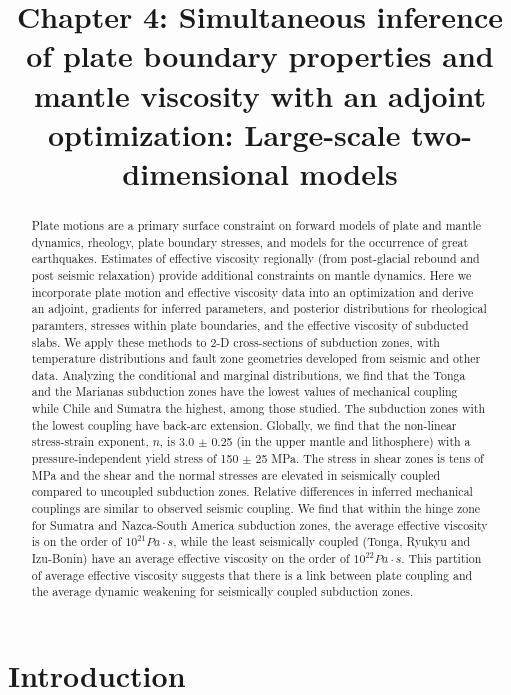 \documentclass[12pt]{article}
\date{}
\title{Chapter 4: Simultaneous inference of plate boundary properties and mantle viscosity with an adjoint optimization: Large-scale two-dimensional models}
\begin{document}
\maketitle
\begin{abstract}
 Plate motions are a primary surface constraint on forward models of plate and mantle dynamics, rheology, plate boundary stresses, and models for the occurrence of great earthquakes. Estimates of effective viscosity regionally (from post-glacial rebound and post seismic relaxation) provide additional constraints on mantle dynamics. 
Here we incorporate plate motion and effective viscosity data into an optimization and derive an adjoint, gradients for inferred parameters, and posterior distributions for  rheological paramters, stresses within plate boundaries, and the effective viscosity of subducted slabs. 
We apply these methods to 2-D cross-sections of subduction zones, with temperature distributions and fault zone geometries developed from seismic and other data. 
Analyzing the conditional and marginal distributions, we find that the 
Tonga and the Marianas subduction zones have the lowest values of mechanical coupling while Chile and Sumatra the highest, among those studied. The subduction zones with the lowest coupling have back-arc extension. Globally, we find that the non-linear stress-strain exponent, $n$, is 3.0 $\pm$ 0.25 (in the upper mantle and lithosphere) with a pressure-independent yield stress of 150 $\pm$ 25 MPa. The stress in shear zones is tens of MPa and the shear and the normal stresses are elevated in seismically coupled compared to uncoupled subduction zones. 
Relative differences in inferred mechanical couplings are similar to observed seismic coupling. 
We find that within the hinge zone for Sumatra and Nazca-South America subduction zones, the average effective viscosity is on the order of $10^{21} Pa\cdot s$, while the least seismically coupled (Tonga, Ryukyu and Izu-Bonin) have an average effective viscosity on the order of $10^{22} Pa\cdot s$. This partition of average effective viscosity suggests that there is a link between plate coupling and the average dynamic weakening for seismically coupled subduction zones.
\end{abstract} 


\section{Introduction}
\end{document}
